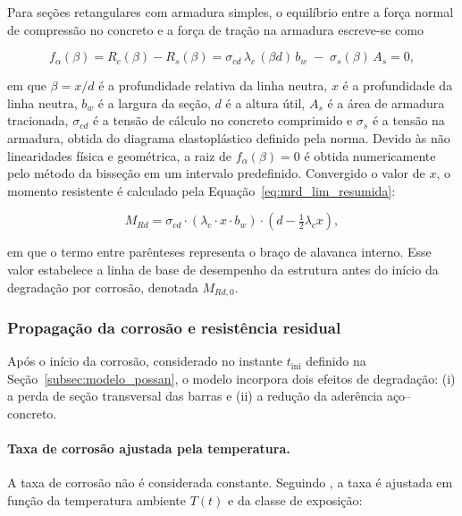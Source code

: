 Para seções retangulares com armadura simples, o equilíbrio entre a força normal de compressão no concreto e a força de tração na armadura escreve-se como

\begin{equation}\label{eq:equilibrio}
f_\alpha(\beta) = R_c(\beta) - R_s(\beta) = \sigma_{cd}\, \lambda_c\, (\beta d)\, b_w \;-\; \sigma_s(\beta)\, A_s = 0,
\end{equation}

\noindent em que $\beta = x/d$ é a profundidade relativa da linha neutra, $x$ é a profundidade da linha neutra, $b_w$ é a largura da seção, $d$ é a altura útil, $A_s$ é a área de armadura tracionada, $\sigma_{cd}$ é a tensão de cálculo no concreto comprimido e $\sigma_s$ é a tensão na armadura, obtida do diagrama elastoplástico definido pela norma. Devido às não linearidades física e geométrica, a raiz de $f_\alpha(\beta) = 0$ é obtida numericamente pelo método da bisseção em um intervalo predefinido. Convergido o valor de $x$, o momento resistente é calculado pela Equação~\eqref{eq:mrd_lim_resumida}:

\begin{equation}\label{eq:mrd_lim_resumida}
M_{Rd} = \sigma_{cd} \cdot (\lambda_c \cdot x \cdot b_w) \cdot \left(d - \tfrac{1}{2} \lambda_c x\right),
\end{equation}

\noindent em que o termo entre parênteses representa o braço de alavanca interno. Esse valor estabelece a linha de base de desempenho da estrutura antes do início da degradação por corrosão, denotada $M_{Rd,0}$.

\subsubsection{Propaga\c{c}\~ao da corros\~ao e resist\^encia residual}
\label{subsub:residual}

Após o início da corrosão, considerado no instante $t_{\mathrm{ini}}$ definido na Seção~\ref{subsec:modelo_possan}, o modelo incorpora dois efeitos de degradação: (i) a perda de seção transversal das barras e (ii) a redução da aderência aço--concreto.

\paragraph{Taxa de corros\~ao ajustada pela temperatura.}
A taxa de corrosão não é considerada constante. Seguindo \textcite{peng2016}, a taxa é ajustada em função da temperatura ambiente $T(t)$ e da classe de exposição:

